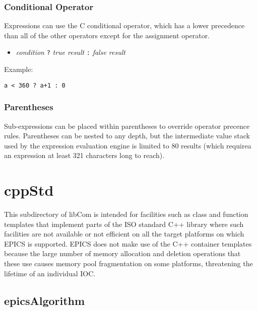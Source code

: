 \subsubsection{Conditional Operator}

Expressions can use the C conditional operator, which has a lower precedence than all of the other operators except for the assignment operator.

\begin{itemize}
\item \emph{condition} \verb|?| \emph{true result} \verb|:| \emph{false result}

\end{itemize}

Example:

\begin{verbatim}
a < 360 ? a+1 : 0
\end{verbatim}

\subsubsection{Parentheses}

Sub-expressions can be placed within parentheses to override operator precence rules.
Parentheses can be nested to any depth, but the intermediate value stack used by the expression evaluation engine is limited to 80 results (which requirea an expression at least 321 characters long to reach).

\section{cppStd}

This subdirectory of libCom is intended for facilities such as class and function templates that implement parts of the ISO standard C++ library where such facilities are not available or not efficient on all the target platforms on which EPICS is supported.
EPICS does not make use of the C++ container templates because the large number of memory allocation and deletion operations that these use causes memory pool fragmentation on some platforms, threatening the lifetime of an individual IOC.

\subsection{epicsAlgorithm}

